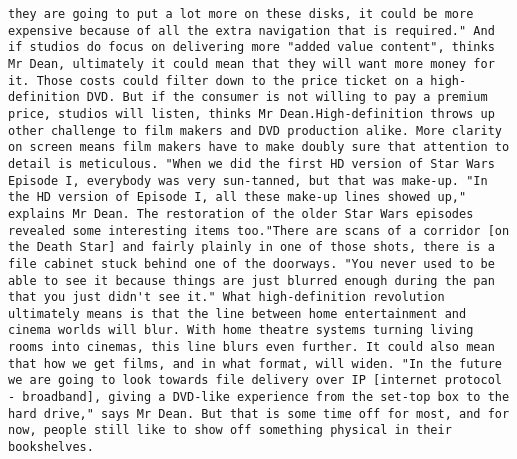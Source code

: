 \documentclass[11pt]{article}
\begin{document}
\begin{Verbatim}[commandchars=\\\{\}]
they are going to put a lot more on these disks, it could be more expensive because of all the extra navigation that is required." And if studios do focus on delivering more "added value content", thinks Mr Dean, ultimately it could mean that they will want more money for it. Those costs could filter down to the price ticket on a high-definition DVD. But if the consumer is not willing to pay a premium price, studios will listen, thinks Mr Dean.High-definition throws up other challenge to film makers and DVD production alike. More clarity on screen means film makers have to make doubly sure that attention to detail is meticulous. "When we did the first HD version of Star Wars Episode I, everybody was very sun-tanned, but that was make-up. "In the HD version of Episode I, all these make-up lines showed up," explains Mr Dean. The restoration of the older Star Wars episodes revealed some interesting items too."There are scans of a corridor [on the Death Star] and fairly plainly in one of those shots, there is a file cabinet stuck behind one of the doorways. "You never used to be able to see it because things are just blurred enough during the pan that you just didn't see it." What high-definition revolution ultimately means is that the line between home entertainment and cinema worlds will blur. With home theatre systems turning living rooms into cinemas, this line blurs even further. It could also mean that how we get films, and in what format, will widen. "In the future we are going to look towards file delivery over IP [internet protocol - broadband], giving a DVD-like experience from the set-top box to the hard drive," says Mr Dean. But that is some time off for most, and for now, people still like to show off something physical in their bookshelves.                                         

\end{Verbatim}
\end{document}
